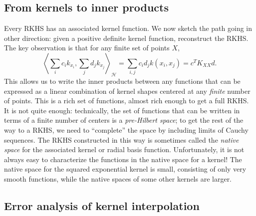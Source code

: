 \documentclass[12pt, leqno]{article} %
\begin{document}
\subsection{From kernels to inner products}

Every RKHS has an associated kernel function.  We now sketch the path
going in other direction: given a positive definite kernel function,
reconstruct the RKHS.  The key observation is that for any finite set
of points $X$,
\[
  \left\langle
    \sum_i c_i k_{x_i}, \sum_j d_j k_{x_j}
  \right\rangle_{\mathcal{H}}
  = \sum_{i,j} c_i d_j k(x_i,x_j)
  = c^T K_{XX} d.
\]
This allows us to write the inner products between any functions that
can be expressed as a linear combination of kernel shapes centered at
any {\em finite} number of points.  This is a rich set of functions,
almost rich enough to get a full RKHS.  It is not quite enough:
technically, the set of functions that can be written in terms of a
finite number of centers is a {\em pre-Hilbert space}; to get the rest
of the way to a RKHS, we need to ``complete'' the space by including
limits of Cauchy sequences.  The RKHS constructed in this way
is sometimes called the {\em native space} for the associated kernel
or radial basis function.
Unfortunately, it is not always easy to characterize the functions
in the native space for a kernel!  The native space for the squared
exponential kernel is small, consisting of only very smooth functions,
while the native spaces of some other kernels are larger.

\subsection{Error analysis of kernel interpolation}
\end{document}
